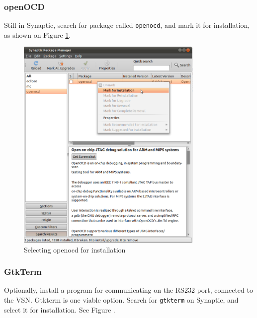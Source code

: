 \documentclass[a4paper, 10pt]{article}
\begin{document}
\subsubsection{openOCD}

Still in Synaptic, search for package called \verb+openocd+, 
and mark it for installation, as shown on Figure \ref{fig:synaptic-openocd}.


    \begin{figure}[H]
    \centering
        \includegraphics[width=0.8\textwidth]{./png-install-guide/synaptic-openocd.png}
        \caption{Selecting openocd for installation}
        \label{fig:synaptic-openocd}
    \end{figure}

\subsubsection{GtkTerm}

Optionally, install a program for communicating on the RS232 port, 
connected to the VSN.
Gtkterm is one viable option.
Search for \verb+gtkterm+ on Synaptic, and select it for installation.
See Figure .
\end{document}
